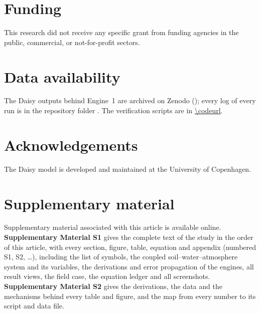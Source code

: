\documentclass[preprint,12pt]{elsarticle}
\begin{document}
\section*{Funding}
This research did not receive any specific grant from funding agencies in the public, commercial, or not-for-profit sectors.

\section*{Data availability}
The Daisy outputs behind Engine~1 are archived on Zenodo (); every log of every run is in the repository folder \cslink{}. The verification scripts are in \url{\codeurl}.

\section*{Acknowledgements}
The Daisy model is developed and maintained at the University of Copenhagen.

\section*{Supplementary material}
Supplementary material associated with this article is available online. \textbf{Supplementary Material S1} gives the complete text of the study in the order of this article, with every section, figure, table, equation and appendix (numbered S1, S2, \ldots), including the list of symbols, the coupled soil--water--atmosphere system and its variables, the derivations and error propagation of the engines, all result views, the field case, the equation ledger and all screenshots. \textbf{Supplementary Material S2} gives the derivations, the data and the mechanisms behind every table and figure, and the map from every number to its script and data file.



\end{document}
